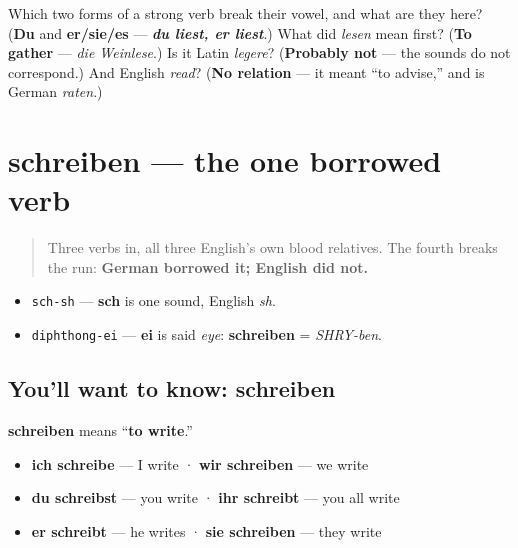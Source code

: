 \begin{tcolorbox}[breakable,colback=teal!4,colframe=teal!35!black,title={Before you move on}]
Which two forms of a strong verb break their vowel, and what are they here? (\textbf{Du} and \textbf{er/sie/es} — \emph{\textbf{du liest, er liest}}.) What did \emph{lesen} mean first? (\textbf{To gather} — \emph{die Weinlese}.) Is it Latin \emph{legere}? (\textbf{Probably not} — the sounds do not correspond.) And English \emph{read}? (\textbf{No relation} — it meant \textquotedblleft{}to advise,\textquotedblright{} and is German \emph{raten}.)
\end{tcolorbox}
\section[schreiben]{schreiben — the one borrowed verb}

\label{lesson:GE-C24-schreiben}



\begin{quote}
Three verbs in, all three English's own blood relatives. The fourth breaks the run: \textbf{German borrowed it; English did not.}
\end{quote}

\begin{sounds}
\begin{itemize}
\raggedright
  \item \texttt{sch-sh} — \textbf{sch} is one sound, English \emph{sh}.
  \item \texttt{diphthong-ei} — \textbf{ei} is said \emph{eye}: \textbf{schreiben} = \emph{SHRY-ben}.
\end{itemize}
\end{sounds}

\subsection*{You'll want to know: schreiben}
\textbf{schreiben} means \textquotedblleft{}\textbf{to write}.\textquotedblright{}

\begin{itemize}
\raggedright
  \item \textbf{ich schreibe} — I write · \textbf{wir schreiben} — we write
  \item \textbf{du schreibst} — you write · \textbf{ihr schreibt} — you all write
  \item \textbf{er schreibt} — he writes · \textbf{sie schreiben} — they write
\end{itemize}

